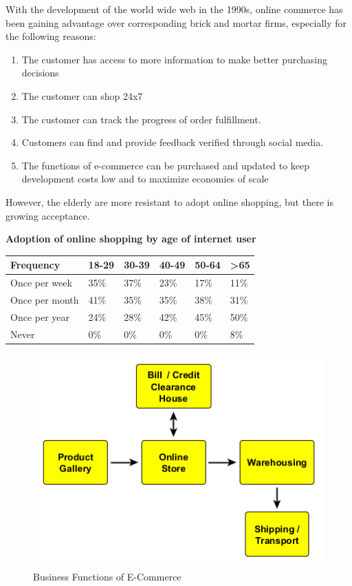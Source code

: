 \documentclass[]{book}
\providecommand{\tightlist}{%
  \setlength{\itemsep}{0pt}\setlength{\parskip}{0pt}}
\begin{document}
With the development of the world wide web in the 1990s, online commerce has been gaining advantage over corresponding brick and mortar firms, especially for the following reasons:

\begin{enumerate}
\def\labelenumi{\arabic{enumi}.}
\tightlist
\item
  The customer has access to more information to make better purchasing decisions
\item
  The customer can shop 24x7
\item
  The customer can track the progress of order fulfillment.
\item
  Customers can find and provide feedback verified through social media.
\item
  The functions of e-commerce can be purchased and updated to keep development costs low and to maximize economies of scale
\end{enumerate}

However, the elderly are more resistant to adopt online shopping, but there is growing acceptance.

\textbf{Adoption of online shopping by age of internet user}

\begin{longtable}[]{@{}llllll@{}}
\toprule
Frequency & 18-29 & 30-39 & 40-49 & 50-64 & \textgreater{}65\tabularnewline
\midrule
\endhead
Once per week & 35\% & 37\% & 23\% & 17\% & 11\%\tabularnewline
Once per month & 41\% & 35\% & 35\% & 38\% & 31\%\tabularnewline
Once per year & 24\% & 28\% & 42\% & 45\% & 50\%\tabularnewline
Never & 0\% & 0\% & 0\% & 0\% & 8\%\tabularnewline
\bottomrule
\end{longtable}

\begin{figure}
\centering
\includegraphics{images/ecommercefunctions.png}
\caption{Business Functions of E-Commerce}
\end{figure}
\end{document}
